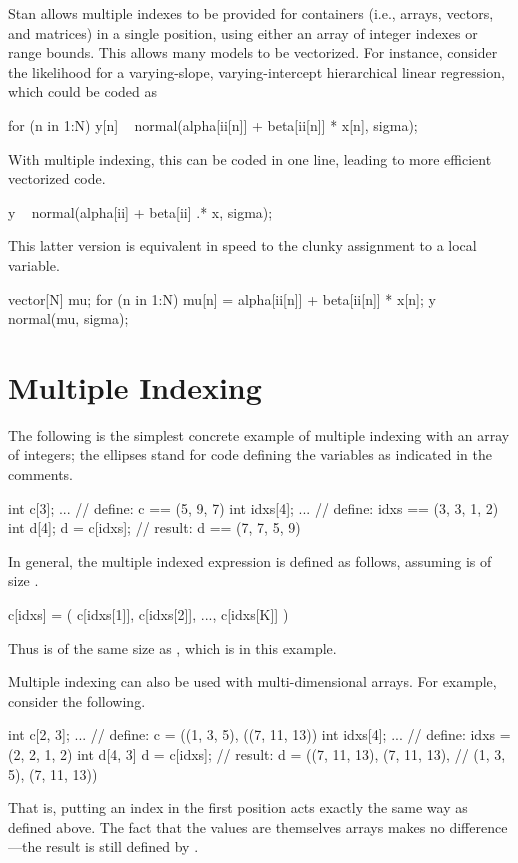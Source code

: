 \noindent
Stan allows multiple indexes to be provided for containers (i.e.,
arrays, vectors, and matrices) in a single position, using either an
array of integer indexes or range bounds.  This allows many models to
be vectorized.  For instance, consider the likelihood for a varying-slope,
varying-intercept hierarchical linear regression, which could be coded
as
%
\begin{stancode}
for (n in 1:N)
  y[n] ~ normal(alpha[ii[n]] + beta[ii[n]] * x[n], sigma);
\end{stancode}
%
With multiple indexing, this can be coded in one line, leading to more
efficient vectorized code.
%
\begin{stancode}
y ~ normal(alpha[ii] + beta[ii] .* x, sigma);
\end{stancode}
%
This latter version is equivalent in speed to the clunky assignment to
a local variable.
%
\begin{stancode}
{ 
  vector[N] mu;
  for (n in 1:N)
    mu[n] = alpha[ii[n]] + beta[ii[n]] * x[n];
  y ~ normal(mu, sigma);
}
\end{stancode}

\section{Multiple Indexing}

The following is the simplest concrete example of multiple indexing
with an array of integers;  the ellipses stand for code defining the
variables as indicated in the comments.
%
\begin{stancode}
int c[3];     
...             // define: c == (5, 9, 7)
int idxs[4];   
...             // define: idxs == (3, 3, 1, 2)
int d[4];
d = c[idxs];   // result: d == (7, 7, 5, 9)
\end{stancode}
%

In general, the multiple indexed expression  is defined
as follows, assuming  is of size .
%
\begin{stancode}
c[idxs] = ( c[idxs[1]], c[idxs[2]], ..., c[idxs[K]] )
\end{stancode}
%
Thus  is of the same size as , which is
 in this example.

Multiple indexing can also be used with multi-dimensional arrays.  For
example, consider the following.
%
\begin{stancode}
int c[2, 3];   
...            // define: c = ((1, 3, 5), ((7, 11, 13))
int idxs[4];
...            // define: idxs = (2, 2, 1, 2)
int d[4, 3]
d = c[idxs];  // result: d = ((7, 11, 13), (7, 11, 13),
               //              (1, 3, 5), (7, 11, 13))
\end{stancode}
%
That is, putting an index in the first position acts exactly the same
way as defined above.  The fact that the values are themselves arrays
makes no difference---the result is still defined by .

